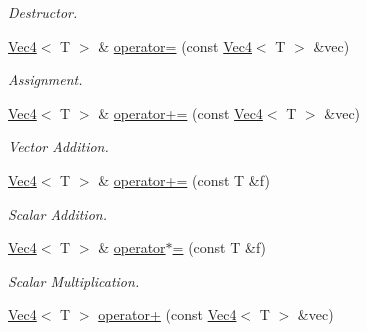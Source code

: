 \begin{DoxyCompactItemize}
\begin{DoxyCompactList}\small\item\em Destructor. \item\end{DoxyCompactList}\item 
\hypertarget{classMath_1_1Vec4_a89d8bec68cc2f663ae1a0eeec8c17a0f}{
\hyperlink{classMath_1_1Vec4}{Vec4}$<$ T $>$ \& \hyperlink{classMath_1_1Vec4_a89d8bec68cc2f663ae1a0eeec8c17a0f}{operator=} (const \hyperlink{classMath_1_1Vec4}{Vec4}$<$ T $>$ \&vec)}
\label{classMath_1_1Vec4_a89d8bec68cc2f663ae1a0eeec8c17a0f}

\begin{DoxyCompactList}\small\item\em Assignment. \item\end{DoxyCompactList}\item 
\hypertarget{classMath_1_1Vec4_a0a18b8a52059271860876552c72c2ec8}{
\hyperlink{classMath_1_1Vec4}{Vec4}$<$ T $>$ \& \hyperlink{classMath_1_1Vec4_a0a18b8a52059271860876552c72c2ec8}{operator+=} (const \hyperlink{classMath_1_1Vec4}{Vec4}$<$ T $>$ \&vec)}
\label{classMath_1_1Vec4_a0a18b8a52059271860876552c72c2ec8}

\begin{DoxyCompactList}\small\item\em Vector Addition. \item\end{DoxyCompactList}\item 
\hypertarget{classMath_1_1Vec4_a2df266d5745c1e026a25a3fe2f032f02}{
\hyperlink{classMath_1_1Vec4}{Vec4}$<$ T $>$ \& \hyperlink{classMath_1_1Vec4_a2df266d5745c1e026a25a3fe2f032f02}{operator+=} (const T \&f)}
\label{classMath_1_1Vec4_a2df266d5745c1e026a25a3fe2f032f02}

\begin{DoxyCompactList}\small\item\em Scalar Addition. \item\end{DoxyCompactList}\item 
\hypertarget{classMath_1_1Vec4_a35b26afebbf554dfa1ba1d19c2ece681}{
\hyperlink{classMath_1_1Vec4}{Vec4}$<$ T $>$ \& \hyperlink{classMath_1_1Vec4_a35b26afebbf554dfa1ba1d19c2ece681}{operator$\ast$=} (const T \&f)}
\label{classMath_1_1Vec4_a35b26afebbf554dfa1ba1d19c2ece681}

\begin{DoxyCompactList}\small\item\em Scalar Multiplication. \item\end{DoxyCompactList}\item 
\hypertarget{classMath_1_1Vec4_a6f303509a0a6070fb5acfd8ed47b5726}{
\hyperlink{classMath_1_1Vec4}{Vec4}$<$ T $>$ \hyperlink{classMath_1_1Vec4_a6f303509a0a6070fb5acfd8ed47b5726}{operator+} (const \hyperlink{classMath_1_1Vec4}{Vec4}$<$ T $>$ \&vec)}
\label{classMath_1_1Vec4_a6f303509a0a6070fb5acfd8ed47b5726}


\end{DoxyCompactItemize}
